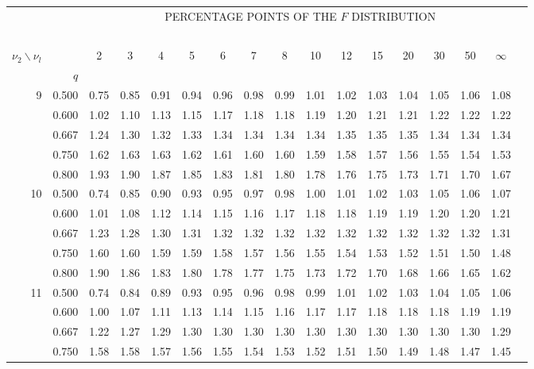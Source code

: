 {\newpage

\thispagestyle{empty}

\begin{center}
\begin{tabular}{rrr@{\,}r@{\,}r@{\,}r@{\,}r@{\,}r@{\,}r@{\,}r
                   @{\,}r@{\,}r@{\,}r@{\,}r@{\,}r@{\,}r@{\,}r}
&&\multicolumn{14}{c}{PERCENTAGE POINTS OF THE $F$ DISTRIBUTION}\\
\ \\
$\nu_2\backslash\nu_l$ & & 
\multicolumn{1}{c}{2} &\multicolumn{1}{c}{3} &
\multicolumn{1}{c}{4} &\multicolumn{1}{c}{5} &
\multicolumn{1}{c}{6} &\multicolumn{1}{c}{7} &
\multicolumn{1}{c}{8} &\multicolumn{1}{c}{10}&
\multicolumn{1}{c}{12}&\multicolumn{1}{c}{15}&
\multicolumn{1}{c}{20}&\multicolumn{1}{c}{30}&
\multicolumn{1}{c}{50}&\multicolumn{1}{c}{$\infty$}\\
& $q$ \\
 9&0.500&0.75&0.85&0.91&0.94&0.96&0.98&0.99&1.01&1.02&1.03&1.04&1.05&1.06&1.08\\
  &0.600&1.02&1.10&1.13&1.15&1.17&1.18&1.18&1.19&1.20&1.21&1.21&1.22&1.22&1.22\\
  &0.667&1.24&1.30&1.32&1.33&1.34&1.34&1.34&1.34&1.35&1.35&1.35&1.34&1.34&1.34\\
  &0.750&1.62&1.63&1.63&1.62&1.61&1.60&1.60&1.59&1.58&1.57&1.56&1.55&1.54&1.53\\
  &0.800&1.93&1.90&1.87&1.85&1.83&1.81&1.80&1.78&1.76&1.75&1.73&1.71&1.70&1.67\\
10&0.500&0.74&0.85&0.90&0.93&0.95&0.97&0.98&1.00&1.01&1.02&1.03&1.05&1.06&1.07\\
  &0.600&1.01&1.08&1.12&1.14&1.15&1.16&1.17&1.18&1.18&1.19&1.19&1.20&1.20&1.21\\
  &0.667&1.23&1.28&1.30&1.31&1.32&1.32&1.32&1.32&1.32&1.32&1.32&1.32&1.32&1.31\\
  &0.750&1.60&1.60&1.59&1.59&1.58&1.57&1.56&1.55&1.54&1.53&1.52&1.51&1.50&1.48\\
  &0.800&1.90&1.86&1.83&1.80&1.78&1.77&1.75&1.73&1.72&1.70&1.68&1.66&1.65&1.62\\
11&0.500&0.74&0.84&0.89&0.93&0.95&0.96&0.98&0.99&1.01&1.02&1.03&1.04&1.05&1.06\\
  &0.600&1.00&1.07&1.11&1.13&1.14&1.15&1.16&1.17&1.17&1.18&1.18&1.18&1.19&1.19\\
  &0.667&1.22&1.27&1.29&1.30&1.30&1.30&1.30&1.30&1.30&1.30&1.30&1.30&1.30&1.29\\
  &0.750&1.58&1.58&1.57&1.56&1.55&1.54&1.53&1.52&1.51&1.50&1.49&1.48&1.47&1.45\\

\end{tabular}
\end{center}}
